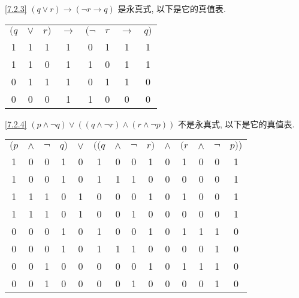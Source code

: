 \documentclass[boxes]{homework}
\begin{document}
\begin{solution}
    \ref{7.2.3}   $(q\lor r)\to(\lnot r\to q)$ 是永真式, 以下是它的真值表.
    \begin{center}
        \begin{tabular}{ccc|c|cccc}
            $(q$ & $\lor$ & $r)$ & $\to$ & $(\lnot$ & $r$ & $\to$ & $q)$ \\
            1    & 1      & 1    & 1     & 0        & 1   & 1     & 1    \\
            1    & 1      & 0    & 1     & 1        & 0   & 1     & 1    \\
            0    & 1      & 1    & 1     & 0        & 1   & 1     & 0    \\
            0    & 0      & 0    & 1     & 1        & 0   & 0     & 0
        \end{tabular}
    \end{center}
    \ref{7.2.4}   $(p\land\lnot q)\lor((q\land \lnot r)\land(r\land\lnot p))$ 不是永真式, 以下是它的真值表.
    \begin{center}
        \begin{tabular}{cccc|c|ccccccccc}
            $(p$ & $\land$ & $\lnot$ & $q)$ & $\lor$ & $((q$ & $\land$ & $\lnot$ & $r)$ & $\land$ & $(r$ & $\land$ & $\lnot$ & $p))$ \\
            1    & 0       & 0       & 1    & 0      & 1     & 0       & 0       & 1    & 0       & 1    & 0       & 0       & 1     \\
            1    & 0       & 0       & 1    & 0      & 1     & 1       & 1       & 0    & 0       & 0    & 0       & 0       & 1     \\
            1    & 1       & 1       & 0    & 1      & 0     & 0       & 0       & 1    & 0       & 1    & 0       & 0       & 1     \\
            1    & 1       & 1       & 0    & 1      & 0     & 0       & 1       & 0    & 0       & 0    & 0       & 0       & 1     \\
            0    & 0       & 0       & 1    & 0      & 1     & 0       & 0       & 1    & 0       & 1    & 1       & 1       & 0     \\
            0    & 0       & 0       & 1    & 0      & 1     & 1       & 1       & 0    & 0       & 0    & 0       & 1       & 0     \\
            0    & 0       & 1       & 0    & 0      & 0     & 0       & 0       & 1    & 0       & 1    & 1       & 1       & 0     \\
            0    & 0       & 1       & 0    & 0      & 0     & 0       & 1       & 0    & 0       & 0    & 0       & 1       & 0

\end{tabular}
\end{center}
\end{solution}
\end{document}
